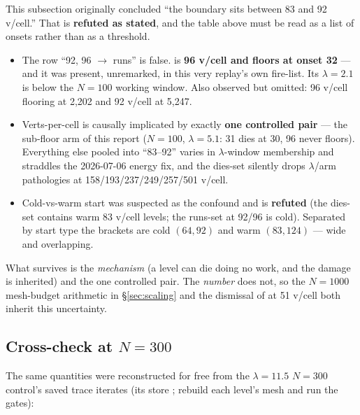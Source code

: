 \documentclass[11pt,a4paper]{article}
\begin{document}
\begin{tcolorbox}[colback=red!4!white,colframe=red!55!black,
  title={Correction (2026-08-15, adversarial review): the boundary's
  \emph{location} is not established}]
This subsection originally concluded ``the boundary sits between 83 and 92
v/cell.'' That is \textbf{refuted as stated}, and the table above must be read as
a list of onsets rather than as a threshold.

\begin{itemize}\itemsep2pt
  \item The row ``92, 96 \(\to\) runs'' is false.  is
    \textbf{96 v/cell and floors at onset 32} --- and it was present, unremarked,
    in this very replay's own fire-list. Its \(\lambda{=}2.1\) is below the
    \(N{=}100\) working window. Also observed but omitted: 96 v/cell flooring at
    2{,}202 and 92 v/cell at 5{,}247.
  \item Verts-per-cell is causally implicated by exactly \textbf{one controlled
    pair} --- the sub-floor arm of this report (\(N{=}100\), \(\lambda{=}5.1\):
    31 dies at 30, 96 never floors). Everything else pooled into ``83--92''
    varies in \(\lambda\)-window membership and straddles the 2026-07-06 energy
    fix, and the dies-set silently drops \(\lambda\)/arm pathologies at
    158/193/237/249/257/501 v/cell.
  \item Cold-vs-warm start was suspected as the confound and is \textbf{refuted}
    (the dies-set contains warm 83 v/cell levels; the runs-set at 92/96 is cold).
    Separated by start type the brackets are cold \((64, 92)\) and warm
    \((83, 124)\) --- wide and overlapping.
\end{itemize}

What survives is the \emph{mechanism} (a level can die doing no work, and the
damage is inherited) and the one controlled pair. The \emph{number} does not, so
the \(N{=}1000\) mesh-budget arithmetic in \S\ref{sec:scaling} and the dismissal
of  at 51 v/cell both
inherit this uncertainty.
\end{tcolorbox}

\subsection{Cross-check at \texorpdfstring{\(N{=}300\)}{N=300}}

The same quantities were reconstructed for free from the \(\lambda{=}11.5\)
\(N{=}300\) control's saved trace iterates (its 
store ; rebuild each level's mesh and run the gates):
\end{document}
